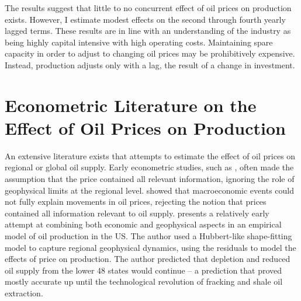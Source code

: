 \documentclass[12pt]{article}
\begin{document}
The results suggest that little to no concurrent effect of oil prices on production exists.  However, I estimate modest effects on the second through fourth yearly lagged terms. These results are in line with an understanding of the industry as being highly capital intensive with high operating costs.  Maintaining spare capacity in order to adjust to changing oil prices may be prohibitively expensive.  Instead, production adjusts only with a lag, the result of a change in investment.

\section{Econometric Literature on the Effect of Oil Prices on Production}


An extensive literature exists that attempts to estimate the effect of oil prices on regional or global oil supply. Early econometric studies, such as \citet{adelman_fea_1975}, often made the assumption that the price contained all relevant information, ignoring the role of geophysical limits at the regional level. \citet{hamilton_oil_1983} showed that macroeconomic events could not fully explain movements in oil prices, rejecting the notion that prices contained all information relevant to oil supply. \citet{kaufmann_oil_1991} presents a relatively early attempt at combining both economic and geophysical aspects in an empirical model of oil production in the US. The author used a Hubbert-like \citep{hubbert_energy_1962} shape-fitting model to capture regional geophysical dynamics, using the residuals to model the effects of price on production. The author predicted that depletion and reduced oil supply from the lower 48 states would continue -- a prediction that proved mostly accurate up until the technological revolution of fracking and shale oil extraction. 
\end{document}
